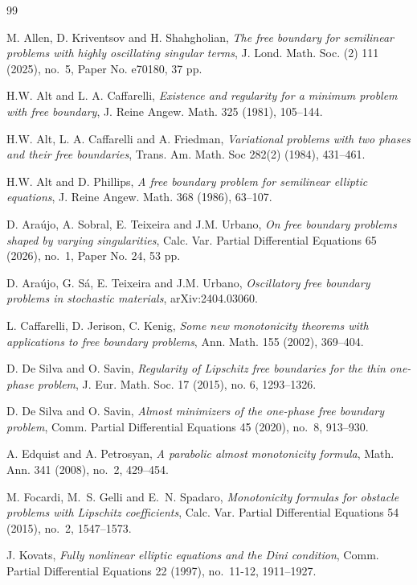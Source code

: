 \documentclass[reqno,11pt]{amsart}
\newcommand{\1}{\mathds{1}}  %
\numberwithin{equation}{section}
\begin{document}
\begin{thebibliography}{99} 

 M. Allen, D. Kriventsov and H. Shahgholian, 
\textit{The free boundary for semilinear problems with highly oscillating singular terms}, 
J. Lond. Math. Soc. (2) 111 (2025), no.~5, Paper No. e70180, 37 pp.

 H.W. Alt and L. A. Caffarelli,  
\textit{Existence and regularity for a minimum problem with free boundary},
J. Reine Angew. Math. 325 (1981), 105--144.

 H.W. Alt, L. A. Caffarelli and A. Friedman,
\textit{Variational problems with two phases and their free boundaries},
Trans. Am. Math. Soc 282(2) (1984), 431--461.

 H.W. Alt and D. Phillips, 
\textit{A free boundary problem for semilinear elliptic equations},  
J. Reine Angew. Math. 368 (1986), 63--107.

 D. Araújo, A. Sobral, E. Teixeira and J.M. Urbano, 
\textit{On free boundary problems shaped by varying singularities}, 
Calc. Var. Partial Differential Equations 65 (2026), no.~1, Paper No. 24, 53 pp.

 D. Araújo, G. Sá, E. Teixeira and J.M. Urbano,
\textit{Oscillatory free boundary problems in stochastic materials},
arXiv:2404.03060.

 L. Caffarelli, D. Jerison, C. Kenig,
\textit{Some new monotonicity theorems with applications
to free boundary problems}, 
Ann. Math. 155 (2002), 369–404.  

 D. De Silva and O. Savin, 
{\it Regularity of Lipschitz free boundaries for the thin one-phase problem}, 
J. Eur. Math. Soc. 17 (2015), no. 6, 1293--1326. 

 D. De Silva and O. Savin, 
\textit{Almost minimizers of the one-phase free boundary problem}, 
Comm. Partial Differential Equations 45 (2020), no.~8, 913--930.

 A. Edquist and A. Petrosyan, 
\textit{A parabolic almost monotonicity formula}, 
Math. Ann. 341 (2008), no.~2, 429--454.

 M. Focardi, M.~S. Gelli and E.~N. Spadaro, 
\textit{Monotonicity formulas for obstacle problems with Lipschitz coefficients}, 
Calc. Var. Partial Differential Equations 54 (2015), no.~2, 1547--1573.

 J. Kovats, 
\textit{Fully nonlinear elliptic equations and the Dini condition}, Comm. Partial Differential Equations 22 (1997), no.~11-12, 1911--1927.


\end{thebibliography}
\end{document}
